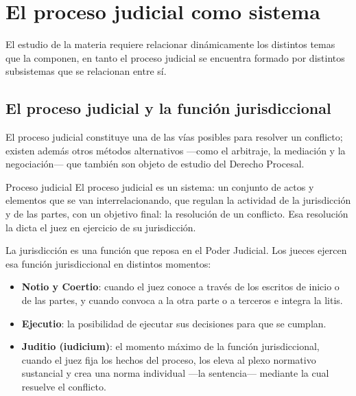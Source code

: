 \documentclass[12pt,oneside]{book}
\begin{document}
\chapter{El proceso judicial como sistema}

El estudio de la materia requiere relacionar dinámicamente los distintos temas que la componen, en tanto el proceso judicial se encuentra formado por distintos subsistemas que se relacionan entre sí.

\section{El proceso judicial y la función jurisdiccional}

El proceso judicial constituye una de las vías posibles para resolver un conflicto; existen además otros métodos alternativos —como el arbitraje, la mediación y la negociación— que también son objeto de estudio del Derecho Procesal.

\begin{definition}{Proceso judicial}
El proceso judicial es un sistema: un conjunto de actos y elementos que se van interrelacionando, que regulan la actividad de la jurisdicción y de las partes, con un objetivo final: la resolución de un conflicto. Esa resolución la dicta el juez en ejercicio de su jurisdicción.
\end{definition}

La jurisdicción es una función que reposa en el Poder Judicial. Los jueces ejercen esa función jurisdiccional en distintos momentos:

\begin{itemize}
    \item \textbf{Notio y Coertio}: cuando el juez conoce a través de los escritos de inicio o de las partes, y cuando convoca a la otra parte o a terceros e integra la litis.
    \item \textbf{Ejecutio}: la posibilidad de ejecutar sus decisiones para que se cumplan.
    \item \textbf{Juditio (iudicium)}: el momento máximo de la función jurisdiccional, cuando el juez fija los hechos del proceso, los eleva al plexo normativo sustancial y crea una norma individual —la sentencia— mediante la cual resuelve el conflicto.
\end{itemize}
\end{document}
